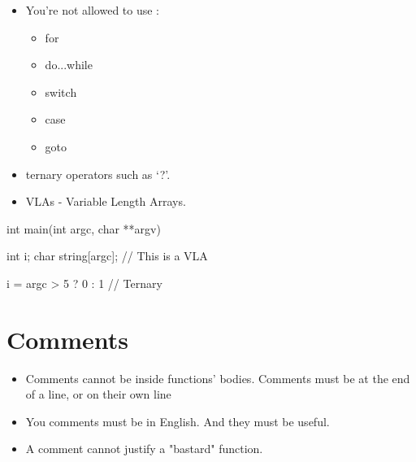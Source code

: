 \documentclass{42-en}
\begin{document}
        \begin{itemize}

            \item You're not allowed to use :

                \begin{itemize}

                    \item for
                    \item do...while
                    \item switch
                    \item case
                    \item goto

                \end{itemize}

            \item ternary operators such as `?'.

            \item VLAs - Variable Length Arrays.

        \end{itemize}
        \begin{42ccode}
    int main(int argc, char **argv)
    {
        int     i;
        char    string[argc]; // This is a VLA

        i = argc > 5 ? 0 : 1 // Ternary
    }
        \end{42ccode}
        \newpage

    \section{Comments}

        \begin{itemize}

            \item Comments cannot be inside functions' bodies.
                Comments must be at the end of a line, or on their own line

            \item You comments must be in English. And they must be
                useful.

            \item A comment cannot justify a "bastard" function.

        \end{itemize}
        \newpage
\end{document}
